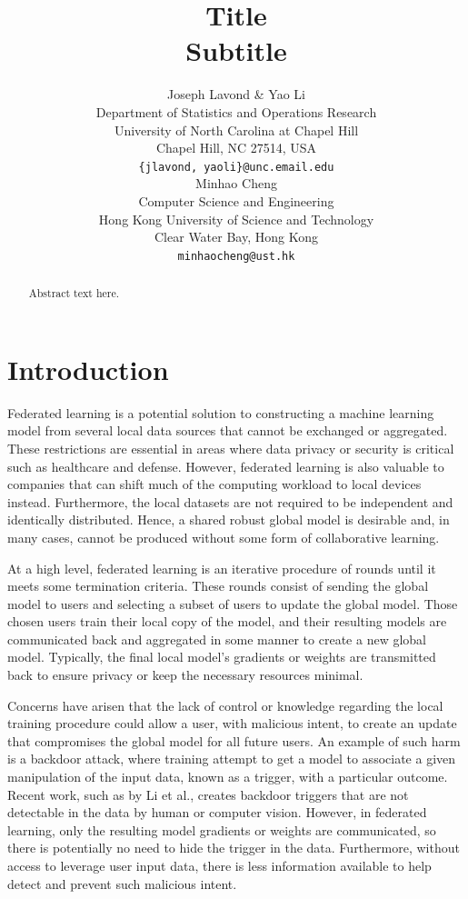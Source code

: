 \documentclass{article} %
\title{Title \\ Subtitle}
\author{%
    Joseph Lavond \& Yao Li  \\
    Department of Statistics and Operations Research \\
    University of North Carolina at Chapel Hill \\
    Chapel Hill, NC 27514, USA \\
    \texttt{\{jlavond, yaoli\}@unc.email.edu} \\
    \And
    Minhao Cheng \\
    Computer Science and Engineering \\
    Hong Kong University of Science and Technology \\
    Clear Water Bay, Hong Kong \\
    \texttt{minhaocheng@ust.hk}
}
\begin{document}
\maketitle

\begin{abstract}
Abstract text here.
\end{abstract}

\section{Introduction}

Federated learning is a potential solution to constructing a machine learning model from several local data sources that cannot be exchanged or aggregated. These restrictions are essential in areas where data privacy or security is critical such as healthcare and defense. However, federated learning is also valuable to companies that can shift much of the computing workload to local devices instead. Furthermore, the local datasets are not required to be independent and identically distributed. Hence, a shared robust global model is desirable and, in many cases, cannot be produced without some form of collaborative learning.

At a high level, federated learning is an iterative procedure of rounds until it meets some termination criteria. These rounds consist of sending the global model to users and selecting a subset of users to update the global model. Those chosen users train their local copy of the model, and their resulting models are communicated back and aggregated in some manner to create a new global model. Typically, the final local model's gradients or weights are transmitted back to ensure privacy or keep the necessary resources minimal. 

Concerns have arisen that the lack of control or knowledge regarding the local training procedure could allow a user, with malicious intent, to create an update that compromises the global model for all future users. An example of such harm is a backdoor attack, where training attempt to get a model to associate a given manipulation of the input data, known as a trigger, with a particular outcome. Recent work, such as by Li et al., creates backdoor triggers that are not detectable in the data by human or computer vision. However, in federated learning, only the resulting model gradients or weights are communicated, so there is potentially no need to hide the trigger in the data. Furthermore, without access to leverage user input data, there is less information available to help detect and prevent such malicious intent.
\end{document}
